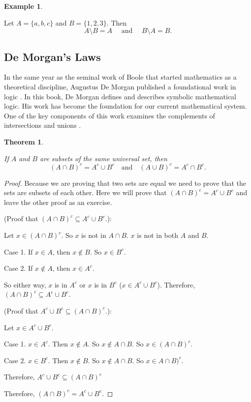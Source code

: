 \documentclass[
]{book}
\newtheorem{theorem}{Theorem}[chapter]
\theoremstyle{definition}
\theoremstyle{definition}
\newtheorem{example}{Example}[chapter]
\theoremstyle{definition}
\theoremstyle{definition}
\theoremstyle{remark}
\begin{document}
\begin{example}
\protect\hypertarget{exm:unlabeled-div-17}{}\label{exm:unlabeled-div-17}

Let \(A=\{a,b,c\}\) and \(B=\{1,2,3\}\). Then
\[A\setminus B = A \quad \mbox{ and } \quad B\setminus A =B.\]

\end{example}

\hypertarget{de-morgans-laws}{%
\subsection{De Morgan's Laws}\label{de-morgans-laws}}

In the same year as the seminal work of Boole \citeyearpar{Boole} that started mathematics as a theoretical discipline, Augustus De Morgan published a foundational work in logic \citep{DeMorgan}. In this book, De Morgan defines and describes symbolic mathematical logic. His work has become the foundation for our current mathematical system. One of the key components of this work examines the complements of intersections and unions \citep[p.~69]{DeMorgan}.

\begin{theorem}
\protect\hypertarget{thm:DeMorgan-laws}{}\label{thm:DeMorgan-laws}

If \(A\) and \(B\) are subsets of the same universal set, then
\[ \left(A \cap B\right)^c = A^c \cup B^c \quad \mbox{and} \quad \left(A \cup B \right)^c = A^c \cap B^c.\]

\end{theorem}

\begin{proof}

Because we are proving that two sets are equal we need to prove that the sets are subsets of each other. Here we will prove that \(\left(A \cap B\right)^c = A^c \cup B^c\) and leave the other proof as an exercise.

(Proof that \(\left(A \cap B\right)^c \subseteq A^c \cup B^c\).):

Let \(x\in \left(A \cap B\right)^c\). So \(x\) is not in \(A\cap B\). \(x\) is not in both \(A\) and \(B\).

Case 1. If \(x\in A\), then \(x\notin B\). So \(x\in B^c\).

Case 2. If \(x\notin A\), then \(x\in A^c\).

So either way, \(x\) is in \(A^c\) or \(x\) is in \(B^c\) (\(x\in A^c \cup B^c\)). Therefore, \(\left(A \cap B\right)^c \subseteq A^c \cup B^c\).

(Proof that \(A^c \cup B^c \subseteq \left(A \cap B\right)^c\).):

Let \(x \in A^c \cup B^c\).

Case 1. \(x\in A^c\). Then \(x\notin A\). So \(x\notin A\cap B\). So \(x\in (A\cap B)^c\).

Case 2. \(x\in B^c\). Then \(x\notin B\). So \(x\notin A\cap B\). So \(x\in A\cap B)^c\).

Therefore, \(A^c \cup B^c \subseteq \left(A \cap B\right)^c\)

Therefore, \(\left(A \cap B\right)^c = A^c \cup B^c\).

\end{proof}
\end{document}
